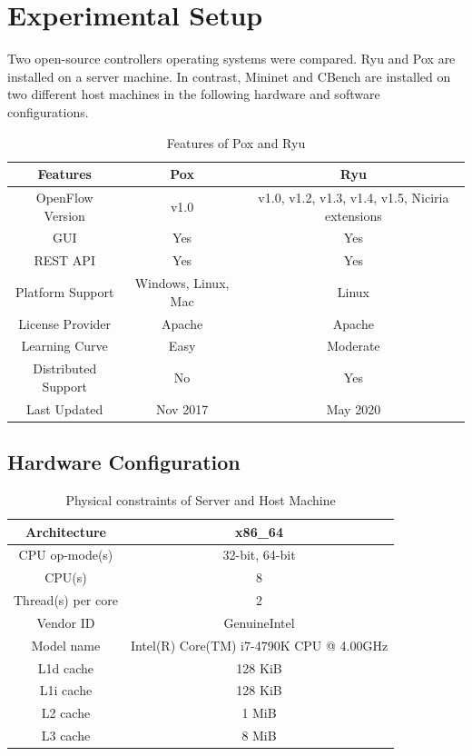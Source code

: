 \chapter{Experimental Setup}
Two open-source controllers operating systems were compared. Ryu and Pox are installed on a server machine. In contrast, Mininet and CBench are installed on two different host machines in the following hardware and software configurations.

 \begin{table}[!hbt]
    \centering
    \begin{tabular}{|c|c|c|}
    \hline
         \textbf{Features} & \textbf{Pox} & \textbf{Ryu} \\ \hline
         OpenFlow Version & v1.0 & v1.0, v1.2, v1.3, v1.4, v1.5, Niciria extensions \\ \hline
         GUI & Yes & Yes \\ \hline
         REST API & Yes & Yes \\ \hline
         Platform Support & Windows, Linux, Mac & Linux \\ \hline
    License Provider & Apache & Apache \\ \hline
    Learning Curve & Easy & Moderate \\ \hline
    Distributed Support & No & Yes \\ \hline
    Last Updated & Nov 2017 & May 2020 \\ \hline
    \end{tabular}
    \caption{Features of Pox and Ryu}
    \label{RyuvsPox}
    \end{table}
    
\section{Hardware Configuration}
    \begin{table}[!hbt]
    \centering
    \caption{Physical constraints of Server and Host Machine}
    \begin{tabular}{|c|c|}
    \hline
    Architecture & x86\_64 \\ \hline
         CPU op-mode(s) & 32-bit, 64-bit \\ \hline
         CPU(s) & 8 \\ \hline
         Thread(s) per core & 2 \\ \hline
         Vendor ID & GenuineIntel \\ \hline
    Model name & Intel(R) Core(TM) i7-4790K CPU @ 4.00GHz \\ \hline
    L1d cache & 128 KiB \\ \hline
    L1i cache & 128 KiB \\ \hline
    L2 cache & 1 MiB \\ \hline
    L3 cache & 8 MiB \\ \hline
    \end{tabular}
    \label{Hardware}
    \end{table}

